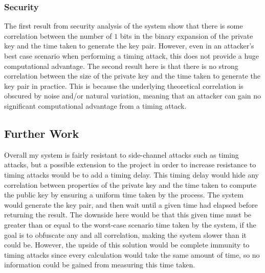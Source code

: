 \documentclass[12pt,a4paper]{article}
\begin{document}
\subsubsection{Security} \noindent
The first result from security analysis of the system show that there is some correlation between the number of $1$ bits in the binary expansion of the private key and the time taken to generate the key pair. 
However, even in an attacker's best case scenario when performing a timing attack, 
this does not provide a huge computational advantage. 
The second result here is that there is no strong correlation between the size of the private key and the time taken to generate the key pair in practice. 
This is because the underlying theoretical correlation is obscured by noise and/or natural variation, 
meaning that an attacker can gain no significant computational advantage from a timing attack. 

\subsection{Further Work} \noindent
Overall my system is fairly resistant to side-channel attacks such as timing attacks, 
but a possible extension to the project in order to increase resistance to timing attacks would be to add a timing delay. 
This timing delay would hide any correlation between properties of the private key and the time taken to compute the public key by ensuring a uniform time taken by the process. 
The system would generate the key pair, and then wait until a given time had elapsed before returning the result. 
The downside here would be that this given time must be greater than or equal to the worst-case scenario time taken by the system, if the goal is to obfuscate any and all correlation, making the system slower than it could be. 
However, the upside of this solution would be complete immunity to timing attacks since every calculation would take the same amount of time, so no information could be gained from measuring this time taken. 



\end{document}
